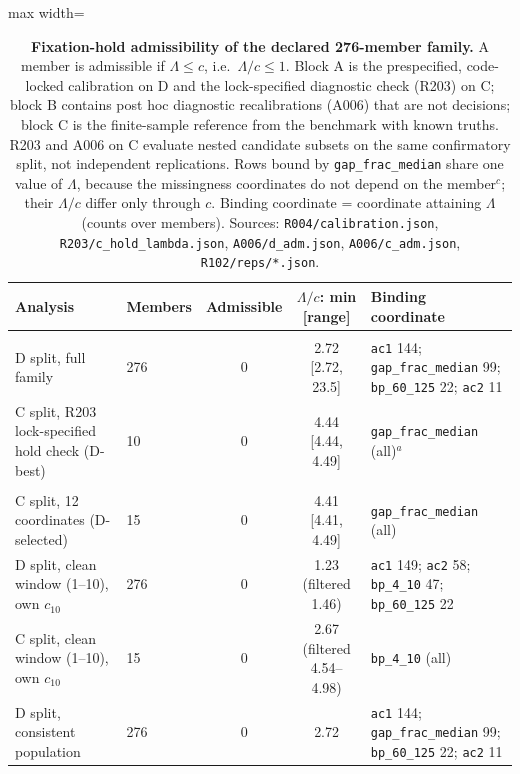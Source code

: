 \begin{table}[ht]
\centering
\caption{\textbf{Fixation-hold admissibility of the declared 276-member family.} A member is admissible if $\Lambda \le c$, i.e.\ $\Lambda/c \le 1$. Block A is the prespecified, code-locked calibration on D and the lock-specified diagnostic check (R203) on C; block B contains post hoc diagnostic recalibrations (A006) that are not decisions; block C is the finite-sample reference from the benchmark with known truths. R203 and A006 on C evaluate nested candidate subsets on the same confirmatory split, not independent replications. Rows bound by \texttt{gap\_frac\_median} share one value of $\Lambda$, because the missingness coordinates do not depend on the member$^{c}$; their $\Lambda/c$ differ only through $c$. Binding coordinate = coordinate attaining $\Lambda$ (counts over members). Sources: \texttt{R004/calibration.json}, \texttt{R203/c\_hold\_lambda.json}, \texttt{A006/d\_adm.json}, \texttt{A006/c\_adm.json}, \texttt{R102/reps/*.json}.}
\label{tab:admissibility}
\footnotesize
\setlength{\tabcolsep}{3pt}
\begin{adjustbox}{max width=\textwidth}
\begin{tabular}{@{}>{\raggedright\arraybackslash}p{5.0cm}lcc>{\raggedright\arraybackslash}p{4.9cm}@{}}
\toprule
Analysis & Members & Admissible & $\Lambda/c$: min [range] & Binding coordinate \\
\midrule
\multicolumn{5}{@{}l}{\textit{A. Prespecified 12-coordinate calibration}} \\
D split, full family & 276 & 0 & 2.72 [2.72, 23.5] & \texttt{ac1} 144; \texttt{gap\_frac\_median} 99; \texttt{bp\_60\_125} 22; \texttt{ac2} 11 \\
C split, R203 lock-specified hold check (D-best) & 10 & 0 & 4.44 [4.44, 4.49] & \texttt{gap\_frac\_median} (all)$^{a}$ \\
\addlinespace
\multicolumn{5}{@{}l}{\textit{B. Post hoc diagnostic recalibrations (A006)}} \\
C split, 12 coordinates (D-selected) & 15 & 0 & 4.41 [4.41, 4.49] & \texttt{gap\_frac\_median} (all) \\
D split, clean window (1--10), own $c_{10}$ & 276 & 0 & 1.23 (filtered 1.46) & \texttt{ac1} 149; \texttt{ac2} 58; \texttt{bp\_4\_10} 47; \texttt{bp\_60\_125} 22 \\
C split, clean window (1--10), own $c_{10}$ & 15 & 0 & 2.67 (filtered 4.54--4.98) & \texttt{bp\_4\_10} (all) \\
D split, consistent population & 276 & 0 & 2.72 & \texttt{ac1} 144; \texttt{gap\_frac\_median} 99; \texttt{bp\_60\_125} 22; \texttt{ac2} 11 \\

\end{tabular}
\end{adjustbox}
\end{table}
